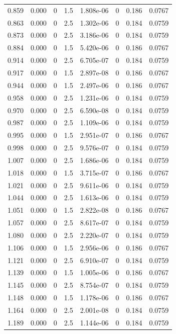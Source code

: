 \documentclass[preview]{standalone}
\begin{document}
{{{\begin{tabular}{L{1.2cm}C{1.2cm} C{0.3cm}C{0.5cm} C{1.4cm}C{1.4cm} C{1.4cm}C{1.4cm}}
  0.859  &  0.000  & 0     & 1.5 &  1.808e-06  & 0  & 0.186 &  0.0767   \\ 
  0.863  &  0.000  & 0     & 2.5 &  1.302e-06  & 0  & 0.184 &  0.0759   \\ 
  0.873  &  0.000  & 0     & 2.5 &  3.186e-06  & 0  & 0.184 &  0.0759   \\ 
  0.884  &  0.000  & 0     & 1.5 &  5.420e-06  & 0  & 0.186 &  0.0767   \\ 
  0.914  &  0.000  & 0     & 2.5 &  6.705e-07  & 0  & 0.184 &  0.0759   \\ 
  0.917  &  0.000  & 0     & 1.5 &  2.897e-08  & 0  & 0.186 &  0.0767   \\ 
  0.944  &  0.000  & 0     & 1.5 &  2.497e-06  & 0  & 0.186 &  0.0767   \\ 
  0.958  &  0.000  & 0     & 2.5 &  1.231e-06  & 0  & 0.184 &  0.0759   \\ 
  0.970  &  0.000  & 0     & 2.5 &  6.590e-08  & 0  & 0.184 &  0.0759   \\ 
  0.987  &  0.000  & 0     & 2.5 &  1.109e-06  & 0  & 0.184 &  0.0759   \\ 
  0.995  &  0.000  & 0     & 1.5 &  2.951e-07  & 0  & 0.186 &  0.0767   \\ 
  0.998  &  0.000  & 0     & 2.5 &  9.576e-07  & 0  & 0.184 &  0.0759   \\ 
  1.007  &  0.000  & 0     & 2.5 &  1.686e-06  & 0  & 0.184 &  0.0759   \\ 
  1.018  &  0.000  & 0     & 1.5 &  3.715e-07  & 0  & 0.186 &  0.0767   \\ 
  1.021  &  0.000  & 0     & 2.5 &  9.611e-06  & 0  & 0.184 &  0.0759   \\ 
  1.044  &  0.000  & 0     & 2.5 &  1.613e-06  & 0  & 0.184 &  0.0759   \\ 
  1.051  &  0.000  & 0     & 1.5 &  2.822e-08  & 0  & 0.186 &  0.0767   \\ 
  1.057  &  0.000  & 0     & 2.5 &  8.617e-07  & 0  & 0.184 &  0.0759   \\ 
  1.080  &  0.000  & 0     & 2.5 &  2.220e-07  & 0  & 0.184 &  0.0759   \\ 
  1.106  &  0.000  & 0     & 1.5 &  2.956e-06  & 0  & 0.186 &  0.0767   \\ 
  1.121  &  0.000  & 0     & 2.5 &  6.910e-07  & 0  & 0.184 &  0.0759   \\ 
  1.139  &  0.000  & 0     & 1.5 &  1.005e-06  & 0  & 0.186 &  0.0767   \\ 
  1.145  &  0.000  & 0     & 2.5 &  8.754e-07  & 0  & 0.184 &  0.0759   \\ 
  1.148  &  0.000  & 0     & 1.5 &  1.178e-06  & 0  & 0.186 &  0.0767   \\ 
  1.164  &  0.000  & 0     & 2.5 &  2.001e-08  & 0  & 0.184 &  0.0759   \\ 
  1.189  &  0.000  & 0     & 2.5 &  1.144e-06  & 0  & 0.184 &  0.0759   \\ 
\hline 
\end{tabular} 

}}}
\end{document}
